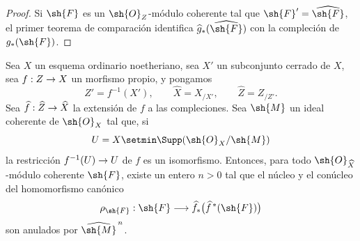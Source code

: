 \documentclass[oneside]{amsart}
\makeatletter
\newcommand{\ega@arrow}[2]{\mathchoice{#1}{#2}{#2}{#2}}
\renewcommand{\to}{\ega@arrow{\longrightarrow}{\rightarrow}}
\let\EGAOriginalLabel\label
\renewcommand{\label}[1]{\phantomsection\EGAOriginalLabel{#1}}
\makeatother
\begin{document}
\begin{proof}
Si $\sh{F}$ es un $\sh{O}_Z$-módulo coherente tal que
$\sh{F}'=\widehat{\sh{F}}$, el primer teorema de comparación
 identifica
$\widehat{g}_*(\widehat{\sh{F}})$ con la compleción de
$g_*(\sh{F})$.
\end{proof}

\begin{lemma}[5.3.4]
\label{III.5.3.4}
Sea $X$ un esquema ordinario noetheriano, sea $X'$ un subconjunto
cerrado de $X$, sea $f:Z\to X$ un morfismo propio, y pongamos
\[
  Z'=f^{-1}(X'),\qquad
  \widehat{X}=X_{/X'},\qquad
  \widehat{Z}=Z_{/Z'}.
\]
Sea $\widehat{f}:\widehat{Z}\to\widehat{X}$ la extensión de $f$
a las compleciones. Sea $\sh{M}$ un ideal coherente de
$\sh{O}_X$ tal que, si
\[
  U=X\setmin\Supp(\sh{O}_X/\sh{M})
\]
la restricción $f^{-1}(U)\to U$ de $f$ es un isomorfismo. Entonces,
para todo $\sh{O}_{\widehat{X}}$-módulo coherente $\sh{F}$, existe
un entero $n>0$ tal que el núcleo y el conúcleo del homomorfismo
canónico
\[
  \rho_{\sh{F}}:
  \sh{F}\longrightarrow
  \widehat{f}_*\bigl(\widehat{f}^{\,*}(\sh{F})\bigr)
\]
 son anulados por
$\widehat{\sh{M}}^{\,n}$.
\end{lemma}
\end{document}
